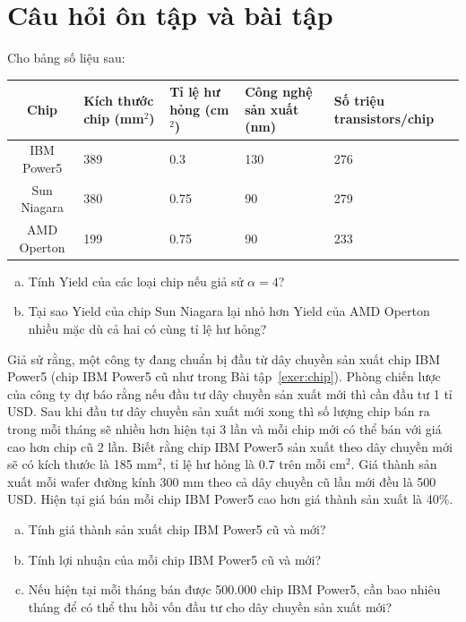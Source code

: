 \section{Câu hỏi ôn tập và bài tập}
\begin{exer}
\label{exer:chip}
Cho bảng số liệu sau:
\begin{table}[h]
\centering
		\begin{tabular}{c||C{2cm}|C{2cm}|C{2cm}|C{2cm}}
		\hline
		\textbf{Chip} & \textbf{Kích thước chip (mm$^2$)} & \textbf{Tỉ lệ hư hỏng (cm$^2$)} & \textbf{Công nghệ sản xuất (nm)} & \textbf{Số triệu transistors/chip}\\
		\hline
		\hline
		IBM Power5 & 389 & 0.3 & 130 & 276\\
		\hline
		Sun Niagara & 380 & 0.75 & 90 & 279\\
		\hline
		AMD Operton & 199 & 0.75 & 90 & 233\\
		\hline
		\end{tabular}
\end{table}

\begin{enumerate}[a.]
\item Tính Yield của các loại chip nếu giả sử $\alpha=4$?
\item Tại sao Yield của chip Sun Niagara lại nhỏ hơn Yield của AMD Operton nhiều mặc dù cả hai có cùng tỉ lệ hư hỏng?
\end{enumerate}
\end{exer}

\begin{exer}
Giả sử rằng, một công ty đang chuẩn bị đầu từ dây chuyền sản xuất chip IBM Power5 (chip IBM Power5 cũ như trong Bài tập~\ref{exer:chip}). Phòng chiến lược của công ty dự báo rằng nếu đầu tư dây chuyền sản xuất mới thì cần đầu tư 1 tỉ USD. Sau khi đầu tư dây chuyền sản xuất mới xong thì số lượng chip bán ra trong mỗi tháng sẽ nhiều hơn hiện tại 3 lần và mỗi chip mới có thể bán với giá cao hơn chip cũ 2 lần. Biết rằng chip IBM Power5 sản xuất theo dây chuyền mới sẽ có kích thước là 185 mm$^2$, tỉ lệ hư hỏng là 0.7 trên mỗi cm$^2$. Giá thành sản xuất mỗi wafer đường kính 300 mm theo cả dây chuyền cũ lần mới đều là 500 USD. Hiện tại giá bán mỗi chip IBM Power5 cao hơn giá thành sản xuất là 40\%.
\begin{enumerate}[a.]
\item Tính giá thành sản xuất chip IBM Power5 cũ và mới?
\item Tính lợi nhuận của mỗi chip IBM Power5 cũ và mới?
\item Nếu hiện tại mỗi tháng bán được 500.000 chip IBM Power5, cần bao nhiêu tháng để có thể thu hồi vốn đầu tư cho dây chuyền sản xuất mới?
\end{enumerate}
\end{exer}

